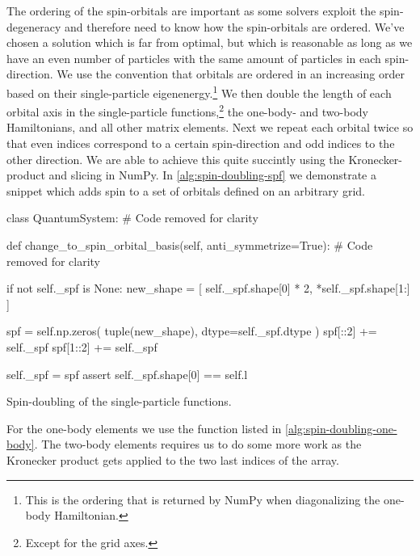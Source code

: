         The ordering of the spin-orbitals are important as some solvers
        exploit the spin-degeneracy and therefore need to know how the
        spin-orbitals are ordered.
        We've chosen a solution which is far from optimal, but which is
        reasonable as long as we have an even number of particles with the same
        amount of particles in each spin-direction.
        We use the convention that orbitals are ordered in an increasing order
        based on their single-particle eigenenergy.\footnote{%
            This is the ordering that is returned by NumPy when diagonalizing
            the one-body Hamiltonian.
        }
        We then double the length of each orbital axis in the single-particle
        functions,\footnote{%
            Except for the grid axes.
        } the one-body- and two-body Hamiltonians, and all other matrix
        elements.
        Next we repeat each orbital twice so that even indices correspond to a
        certain spin-direction and odd indices to the other direction.
        We are able to achieve this quite succintly using the Kronecker-product
        and slicing in NumPy.
        In \autoref{alg:spin-doubling-spf} we demonstrate a snippet which adds
        spin to a set of orbitals defined on an arbitrary grid.
        \begin{algorithm}
            \begin{python}
class QuantumSystem:
    # Code removed for clarity

    def change_to_spin_orbital_basis(self, anti_symmetrize=True):
        # Code removed for clarity

        if not self._spf is None:
            new_shape = [
                self._spf.shape[0] * 2, *self._spf.shape[1:]
            ]

            spf = self.np.zeros(
                tuple(new_shape), dtype=self._spf.dtype
            )
            spf[::2] += self._spf
            spf[1::2] += self._spf

            self._spf = spf
            assert self._spf.shape[0] == self.l
            \end{python}
            \caption{Spin-doubling of the single-particle functions.}
            \label{alg:spin-doubling-spf}
        \end{algorithm}
        For the one-body elements we use the function listed in
        \autoref{alg:spin-doubling-one-body}.
        The two-body elements requires us to do some more work as the Kronecker
        product gets applied to the two last indices of the array.

